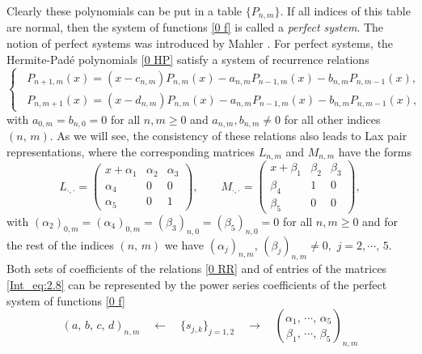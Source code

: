 \documentclass{amsart}
\theoremstyle{remark}
\numberwithin{equation}{section}
\begin{document}
Clearly these polynomials can be put in a table $\{P_{n,m}\}$. If all indices of this table are normal, then the system of functions \eqref{0 f} is called a \textit{perfect system}. The notion of perfect systems was introduced by Mahler \cite{Mah}. For perfect systems, the {Her\-mite-Pad\'e}{} polynomials \eqref{0 HP} satisfy a system of recurrence
relations
\begin{equation} \label{0 RR}
\begin{cases}
    \,\,\,P_{n+1,m}(x) = (x-c_{n,m})P_{n,m}(x) - a_{n,m} P_{n-1,m}(x) - b_{n,m} P_{n,m-1}(x),  \\
    \,\,\,P_{n,m+1}(x) = (x-d_{n,m})P_{n,m}(x) - a_{n,m} P_{n-1,m}(x) - b_{n,m} P_{n,m-1}(x),
\end{cases}
\end{equation}
with $a_{0,m}=b_{n,0}=0$ for all $n,m \geq 0$ and $a_{n,m},b_{n,m}\neq 0$ for all other indices $(n,\,m)$.
As we will see, the consistency of these relations also leads to Lax pair representations, where the corresponding matrices $L_{n,m}$ and $M_{n,m}$ have the forms
\begin{equation} \label{Int_eq:2.8}
    L_{\cdot,\cdot}  = \begin{pmatrix}
                  x+ \alpha_1& \alpha_2 & \alpha_3 \\
                  \alpha_4 & 0 &  0 \\
                  \alpha_5 & 0 &  1
                 \end{pmatrix},\qquad
    M_{\cdot,\cdot}  = \begin{pmatrix}
                  x+\beta_1 & \beta_2 & \beta_3 \\
                  \beta_4 & 1 &  0 \\
                  \beta_5 & 0 &  0
                 \end{pmatrix},
\end{equation}
with $(\alpha_2)_{0,m}=(\alpha_4)_{0,m}=(\beta_3)_{n,0}=(\beta_5)_{n,0}=0$ for all $n,m \geq 0$ and for the rest of the indices $(n,\,m)$ we have $(\alpha_j)_{n,m},\,(\beta_j)_{n,m}\neq 0,\,\, j=2,\cdots,\,5$.
Both sets of coefficients  of the relations \eqref{0 RR} and of entries of the matrices \eqref{Int_eq:2.8} can be represented by  the power series coefficients  of the perfect system of functions \eqref{0 f}
\begin{equation} \label{0 a-s-alpha}
(a,\,b,\,c,\,d)_{n,m}\quad \longleftarrow \quad
\{s_{j,k}\}_{j=1,2} \quad \longrightarrow \quad \binom{\alpha_1,\,\cdots,\,\alpha_5} {\beta_1,\,\cdots,\,\beta_5}_{n,m}
\end{equation}
\end{document}

